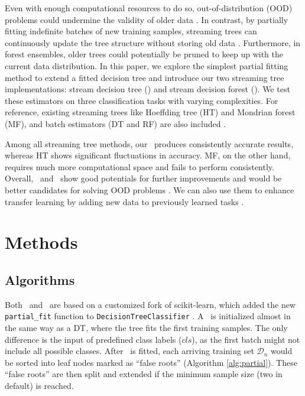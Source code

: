 Even with enough computational resources to do so, out-of-distribution (OOD) problems could undermine the validity of older data \citep{geisa2021theory}. In contrast, by partially fitting indefinite batches of new training samples, streaming trees can continuously update the tree structure without storing old data \citep{hoeffding, bifet2009adaptive, mondrian, JMLR:v11:ben-haim10a}. Furthermore, in forest ensembles, older trees could potentially be pruned to keep up with the current data distribution.
In this paper, we explore the simplest partial fitting method to extend a fitted decision tree and introduce our two streaming tree implementations: stream decision tree (\SDT) and stream decision forest (\SDF).
We test these estimators on three classification tasks with varying complexities. For reference, existing streaming trees like Hoeffding tree (HT) and Mondrian forest (MF), and batch estimators (DT and RF) are also included \citep{hoeffding, mondrian}. 

Among all streaming tree methods, our \SDF~produces consistently accurate results, whereas HT shows significant fluctuations in accuracy. MF, on the other hand, requires much more computational space and fails to perform consistently. Overall, \SDT~and \SDF~show good potentials for further improvements and would be better candidates for solving OOD problems \citep{geisa2021theory}. We can also use them to enhance transfer learning by adding new data to previously learned tasks \citep{vogelstein2021omnidirectional}.

\section{Methods} 
\label{methods}

\subsection{Algorithms}
Both \SDT~and \SDF~are based on a customized fork of scikit-learn, which added the new \texttt{partial\_fit} function to \texttt{DecisionTreeClassifier} \citep{scikit-learn}. A \SDT~is initialized almost in the same way as a DT, where the tree fits the first training samples. The only difference is the input of predefined class labels ($cls$), as the first batch might not include all possible classes. After \SDT~is fitted, each arriving training set $\mathcal{D}_n$ would be sorted into leaf nodes marked as ``false roots'' (Algorithm \ref{alg:partial}). These ``false roots'' are then split and extended if the minimum sample size (two in default) is reached.

